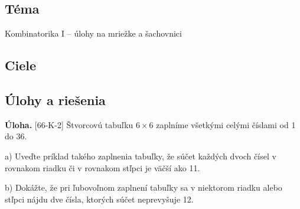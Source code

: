\documentclass[11pt,a4paper,oneside,final]{book}
\newcommand{\ul}{\textbf{Úloha.} }
\begin{document}
\subsection*{Téma}
Kombinatorika I -- úlohy na mriežke a šachovnici
\subsection*{Ciele}


\subsection*{Úlohy a riešenia}
\begin{tcolorbox}[breakable,notitle,boxrule=0pt,colback=light-gray,colframe=light-gray]\ul [66-K-2]
Štvorcovú tabuľku $6\times 6$ zaplníme všetkými celými číslami od 1 do 36.

a) Uveďte príklad takého zaplnenia tabuľky, že súčet každých dvoch čísel v rovnakom riadku či v rovnakom stľpci je väčší ako 11.

b) Dokážte, že pri ľubovoľnom zaplnení tabuľky sa v niektorom riadku alebo stľpci nájdu dve čísla, ktorých súčet neprevyšuje 12.

\end{tcolorbox}
\end{document}
